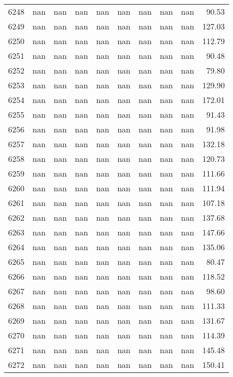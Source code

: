 \begin{tabular}{lrrrrrrrrr}
6248 & nan & nan & nan & nan & nan & nan & nan & nan & 90.53 \\
6249 & nan & nan & nan & nan & nan & nan & nan & nan & 127.03 \\
6250 & nan & nan & nan & nan & nan & nan & nan & nan & 112.79 \\
6251 & nan & nan & nan & nan & nan & nan & nan & nan & 90.48 \\
6252 & nan & nan & nan & nan & nan & nan & nan & nan & 79.80 \\
6253 & nan & nan & nan & nan & nan & nan & nan & nan & 129.90 \\
6254 & nan & nan & nan & nan & nan & nan & nan & nan & 172.01 \\
6255 & nan & nan & nan & nan & nan & nan & nan & nan & 91.43 \\
6256 & nan & nan & nan & nan & nan & nan & nan & nan & 91.98 \\
6257 & nan & nan & nan & nan & nan & nan & nan & nan & 132.18 \\
6258 & nan & nan & nan & nan & nan & nan & nan & nan & 120.73 \\
6259 & nan & nan & nan & nan & nan & nan & nan & nan & 111.66 \\
6260 & nan & nan & nan & nan & nan & nan & nan & nan & 111.94 \\
6261 & nan & nan & nan & nan & nan & nan & nan & nan & 107.18 \\
6262 & nan & nan & nan & nan & nan & nan & nan & nan & 137.68 \\
6263 & nan & nan & nan & nan & nan & nan & nan & nan & 147.66 \\
6264 & nan & nan & nan & nan & nan & nan & nan & nan & 135.06 \\
6265 & nan & nan & nan & nan & nan & nan & nan & nan & 80.47 \\
6266 & nan & nan & nan & nan & nan & nan & nan & nan & 118.52 \\
6267 & nan & nan & nan & nan & nan & nan & nan & nan & 98.60 \\
6268 & nan & nan & nan & nan & nan & nan & nan & nan & 111.33 \\
6269 & nan & nan & nan & nan & nan & nan & nan & nan & 131.67 \\
6270 & nan & nan & nan & nan & nan & nan & nan & nan & 114.39 \\
6271 & nan & nan & nan & nan & nan & nan & nan & nan & 145.48 \\
6272 & nan & nan & nan & nan & nan & nan & nan & nan & 150.41 \\

\end{tabular}
